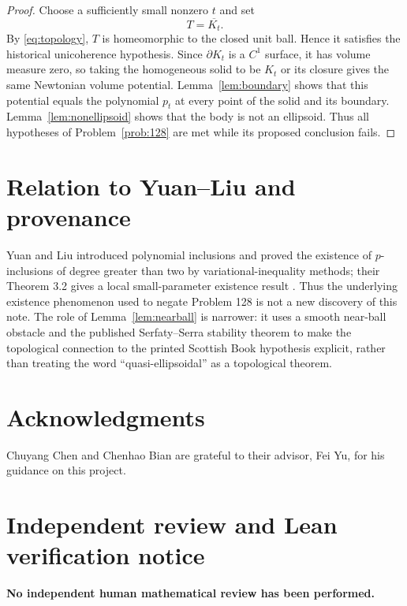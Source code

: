 \documentclass[11pt]{article}
\theoremstyle{definition}
\theoremstyle{remark}
\newcommand{\1}{\mathbf{1}}
\begin{document}
\begin{proof}
Choose a sufficiently small nonzero $t$ and set
\[
 T=\overline{K_t}.
\]
By \eqref{eq:topology}, $T$ is homeomorphic to the closed unit ball. Hence it satisfies the historical unicoherence hypothesis. Since $\partial K_t$ is a $C^1$ surface, it has volume measure zero, so taking the homogeneous solid to be $K_t$ or its closure gives the same Newtonian volume potential. Lemma~\ref{lem:boundary} shows that this potential equals the polynomial $p_t$ at every point of the solid and its boundary. Lemma~\ref{lem:nonellipsoid} shows that the body is not an ellipsoid. Thus all hypotheses of Problem~\ref{prob:128} are met while its proposed conclusion fails.
\end{proof}

\section{Relation to Yuan--Liu and provenance}

Yuan and Liu introduced polynomial inclusions and proved the existence of $p$-inclusions of degree greater than two by variational-inequality methods; their Theorem 3.2 gives a local small-parameter existence result \cite{YuanLiu}. Thus the underlying existence phenomenon used to negate Problem 128 is not a new discovery of this note. The role of Lemma~\ref{lem:nearball} is narrower: it uses a smooth near-ball obstacle and the published Serfaty--Serra stability theorem to make the topological connection to the printed Scottish Book hypothesis explicit, rather than treating the word ``quasi-ellipsoidal'' as a topological theorem.


\section*{Acknowledgments}
Chuyang Chen and Chenhao Bian are grateful to their advisor, Fei Yu, for his guidance on this project.

\section*{Independent review and Lean verification notice}
\begingroup
\small
\begin{center}
\begin{minipage}{0.94\linewidth}
\centering
\textbf{\large No independent human mathematical review has been performed.}
\end{minipage}
\end{center}
\end{document}
